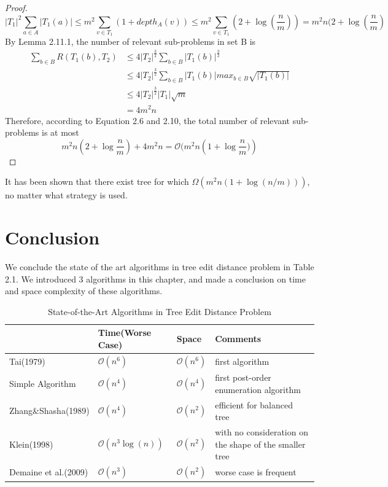 \begin{proof}
\begin{equation}
\left\vert T_1 \right\vert^2\sum_{a \in A}\left\vert T_1(a) \right\vert \leq m^2\sum_{v \in T_1}(1 + depth_A(v)) \leq m^2\sum_{v \in T_1}(2 + \log(\frac{n}{m}))=m^2n(2 + \log(\frac{n}{m})
\end{equation}
By Lemma 2.11.1, the number of relevant sub-problems in set B is 
\begin{align}
\sum_{b \in B}R(T_1(b), T_2) &\leq 4\left\vert T_2 \right\vert^{\frac{3}{2}}\sum_{b \in B}\left\vert T_1(b) \right\vert^{\frac{3}{2}}\\
& \leq 4\left\vert T_2 \right\vert^{\frac{3}{2}}\sum_{b \in B}\left\vert T_1(b) \right\vert max_{b \in B}\sqrt{\left\vert T_1(b) \right\vert}\\
& \leq 4\left\vert T_2 \right\vert^{\frac{3}{2}}\left\vert T_1\right\vert \sqrt{m}\\
&=4m^2n
\end{align}
Therefore, according to Equation 2.6 and 2.10, the total number of relevant sub-problems is at most 
\begin{equation*}
m^2n(2 + \log{\frac{n}{m}}) + 4m^2n = \mathcal{O}(m^2n(1 + \log{\frac{n}{m})})
\end{equation*}
\end{proof}

\begin{remark}
It has been shown that there exist tree for which $\Omega(m^2n(1+\log(n/m)))$, no matter what strategy is used.~\cite{demaine2009optimal}
\end{remark}

\section{Conclusion}
We conclude the state of the art algorithms in tree edit distance problem in Table 2.1. We introduced 3 algorithms in this chapter, and made a conclusion on time and space complexity of these algorithms. 
\begin{table}
			\centering
			\begin{tabular}{l l l l}
				\toprule
				\textbf{} & \textbf{Time(Worse Case)} & \textbf{Space} & \textbf{Comments}\\

				\midrule
				Tai(1979) &  $\mathcal{O}(n^6)$ & $\mathcal{O}(n^6)$ & first algorithm\\
				Simple Algorithm & $\mathcal{O}(n^4)$ & $\mathcal{O}(n^4)$ & first post-order enumeration algorithm\\
				Zhang\&Shasha(1989) & $\mathcal{O}(n^4)$ & $\mathcal{O}(n^2)$ & efficient for balanced tree \\
				Klein(1998) &  $\mathcal{O}(n^3\log(n))$ & $\mathcal{O}(n^2)$ & with no consideration on the shape of the smaller tree\\
				Demaine et al.(2009) &  $\mathcal{O}(n^3)$ & $\mathcal{O}(n^2)$ & worse case is frequent\\
			\end{tabular}
		\caption{State-of-the-Art Algorithms in Tree Edit Distance Problem}
\end{table}

